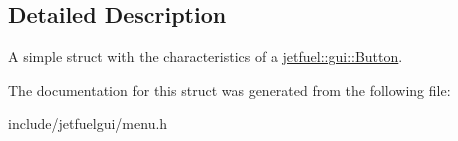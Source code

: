 \subsection{Detailed Description}
A simple struct with the characteristics of a \hyperlink{classjetfuel_1_1gui_1_1Button}{jetfuel\+::gui\+::\+Button}. 

The documentation for this struct was generated from the following file\+:\begin{DoxyCompactItemize}
\item 
include/jetfuelgui/menu.\+h\end{DoxyCompactItemize}
